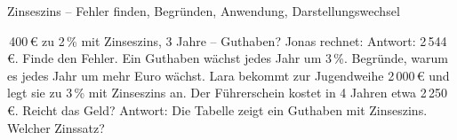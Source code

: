 \begin{aufgabe}{Zinseszins – Fehler finden, Begründen, Anwendung, Darstellungswechsel}
\begin{teile}
\,400\,€ zu 2\,\% mit Zinseszins, 3 Jahre – Guthaben? Jonas rechnet:  Antwort: 2\,544\,€. Finde den Fehler.
\teil Ein Guthaben wächst jedes Jahr um 3\,\%. Begründe, warum es jedes Jahr um mehr Euro wächst.
\teil Lara bekommt zur Jugendweihe 2\,000\,€ und legt sie zu 3\,\% mit Zinseszins an. Der Führerschein kostet in 4 Jahren etwa 2\,250\,€. Reicht das Geld? Antwort: \leerfeld
\teil Die Tabelle zeigt ein Guthaben mit Zinseszins. Welcher Zinssatz?

\leerfeld[\%]
\end{teile}
\end{aufgabe}
